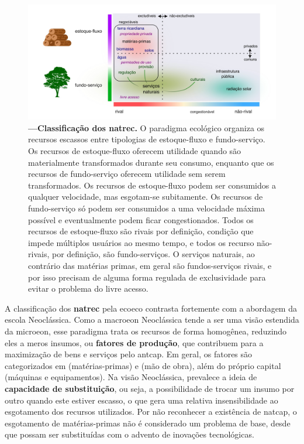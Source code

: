 \documentclass[./main.tex]{subfiles}
\begin{document}
\begin{figure}[t!] 
\centering				
\includegraphics[width=0.98\linewidth]{figs/fig_natrec.jpg}		
\caption[Classificação dos recursos naturais]
{\textbf{---\;Classificação dos \gls{natrec}.}
    O paradigma ecológico organiza os recursos escassos entre tipologias de estoque-fluxo e fundo-serviço. Os recursos de estoque-fluxo oferecem utilidade quando são materialmente transformados durante seu consumo, enquanto que os recursos de fundo-serviço oferecem utilidade sem serem transformados. Os recursos de estoque-fluxo podem ser consumidos a qualquer velocidade, mas esgotam-se subitamente. Os recursos de fundo-serviço só podem ser consumidos a uma velocidade máxima possível e eventualmente podem ficar congestionados. Todos os recursos de estoque-fluxo são rivais por definição, condição que impede múltiplos usuários ao mesmo tempo, e todos os recurso não-rivais, por definição, são fundo-serviços. O serviços naturais, ao contrário das matérias primas, em geral são fundos-serviços rivais, e por isso precisam de alguma forma regulada de exclusividade para evitar o problema do livre acesso.
}
\label{fig:eco:natrec} 		
\end{figure}

\par A classificação dos \textbf{\gls{natrec}} pela \gls{ecoeco} contrasta fortemente com a abordagem da escola Neoclássica. Como a \gls{macroeon} Neoclássica tende a ser uma visão estendida da \gls{microeon}, esse \gls{paradigma} trata os recursos de forma homogênea, reduzindo eles a meros insumos, ou \textbf{fatores de produção}, que contribuem para a maximização de bens e serviços pelo \gls{antcap}. Em geral, os fatores são categorizados em  (matérias-primas) e  (mão de obra), além do próprio capital (máquinas e equipamentos). Na visão Neoclássica, prevalece a ideia de \textbf{capacidade de substituição}, ou seja, a possibilidade de trocar um insumo por outro quando este estiver escasso, o que gera uma relativa insensibilidade ao esgotamento dos recursos utilizados. Por não reconhecer a existência de \gls{natcap}, o esgotamento de matérias-primas não é considerado um problema de base, desde que possam ser substituídas com o advento de inovações tecnológicas. 
\end{document}
